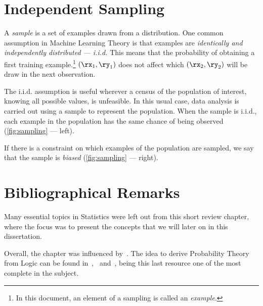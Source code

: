 \section{Independent Sampling}

A \emph{sample} is a set of examples drawn from a distribution.
One common assumption in Machine Learning Theory is that examples are \emph{identically and independently distributed --- i.i.d.} This means that the probability of obtaining a first training example.\footnote{In this document, an element of a sampling is called an \emph{example}. } \((\rx_1, \ry_1)\) does not affect which \((\rx_2, \ry_2)\) will be draw in the next observation.

The i.i.d. assumption is useful wherever a census of the population of interest, knowing all possible values, is unfeasible. In this usual case, data analysis is carried out using a sample to represent the population. When the sample is i.i.d., each example in the population has the same chance of being observed (\cref{fig:sampling} --- left).

If there is a constraint on which examples of the population are sampled, we say that the sample is \emph{biased} (\cref{fig:sampling} --- right).

\section{Bibliographical Remarks}
Many essential topics in Statistics were left out from this short review chapter, where the focus was to present the concepts that we will later on in this dissertation.

Overall, the chapter was influenced by~\citeauthor{wasserman:2013}. The idea to derive Probability Theory from Logic can be found in~\citeauthor{jaynes:2003},~\citeauthor{sowinski:2016} and~\citeauthor{caticha:2008}, being this last resource one of the most complete in the subject.



